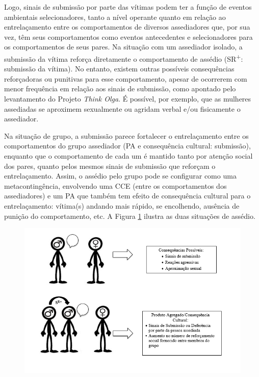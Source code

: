 Logo, sinais de submissão por parte das vítimas podem ter a função de eventos ambientais selecionadores, tanto a nível operante quanto em relação ao entrelaçamento entre os comportamentos de diversos assediadores que, por sua vez, têm seus comportamentos como eventos antecedentes e selecionadores para os comportamentos de seus pares. Na situação com um assediador isolado, a submissão da vítima reforça diretamente o comportamento de assédio (SR\textsuperscript{+}: submissão da vítima). No entanto, existem outras possíveis consequências reforçadoras ou punitivas para esse comportamento, apesar de ocorrerem com menor frequência em relação aos sinais de submissão, como apontado pelo levantamento do Projeto \textit{Think Olga}. É possível, por exemplo, que as mulheres assediadas se aproximem sexualmente ou agridam verbal e/ou fisicamente o assediador.

Na situação de grupo, a submissão parece fortalecer o entrelaçamento entre os comportamentos do grupo assediador (PA e consequência cultural: submissão), enquanto que o comportamento de cada um é mantido tanto por atenção social dos pares, quanto pelos mesmos sinais de submissão que reforçam o entrelaçamento. Assim, o assédio pelo grupo pode se configurar como uma metacontingência, envolvendo uma CCE (entre os comportamentos dos assediadores) e um PA que também tem efeito de consequência cultural para o entrelaçamento: vítima(s) andando mais rápido, se encolhendo, ausência de punição do comportamento, etc. A Figura \ref{figura2} ilustra as duas situações de assédio.

\begin{figure}[ht]
    \begin{center}
        \includegraphics[width=1\textwidth]{7/figura2}
        \label{figura2}
\end{center}
\end{figure}

